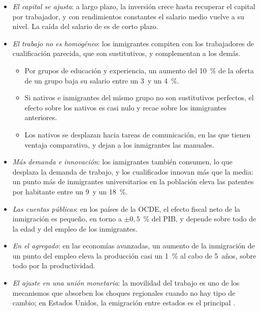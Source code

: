 \documentclass[11pt]{article}
\begin{document}
\begin{itemize}
\item \emph{El capital se ajusta}: a largo plazo, la inversión crece hasta recuperar el capital por trabajador, y con rendimientos constantes el salario medio vuelve a su nivel. La caída del salario de  es de corto plazo\nocite{Borjas2020Labor}.
\item \emph{El trabajo no es homogéneo}: los inmigrantes compiten con los trabajadores de cualificación parecida, que son sustitutivos, y complementan a los demás.
  \begin{itemize}
  \item Por grupos de educación y experiencia, un aumento del 10~\% de la oferta de un grupo baja su salario entre un 3~y un 4~\%\nocite{Borjas2003Labor}.
  \item Si nativos e inmigrantes del mismo grupo no son sustitutivos perfectos, el efecto sobre los nativos es casi nulo y recae sobre los inmigrantes anteriores\nocite{OttavianoPeri2012}.
  \item Los nativos se desplazan hacia tareas de comunicación, en las que tienen ventaja comparativa, y dejan a los inmigrantes las manuales\nocite{PeriSparber2009}.
  \end{itemize}
\item \emph{Más demanda e innovación}: los inmigrantes también consumen, lo que desplaza la demanda de trabajo, y los cualificados innovan más que la media: un punto más de inmigrantes universitarios en la población eleva las patentes por habitante entre un 9~y un 18~\%\nocite{HuntGauthierLoiselle2010}.
\item \emph{Las cuentas públicas}: en los países de la OCDE, el efecto fiscal neto de la inmigración es pequeño, en torno a $\pm0{,}5$~\% del PIB, y depende sobre todo de la edad y del empleo de los inmigrantes\nocite{OCDE2013IMO}.
\item \emph{En el agregado}: en las economías avanzadas, un aumento de la inmigración de un punto del empleo eleva la producción casi un 1~\% al cabo de 5~años, sobre todo por la productividad\nocite{FMI2020WEOMigracion}.
\item \emph{El ajuste en una unión monetaria}: la movilidad del trabajo es uno de los mecanismos que absorben los choques regionales cuando no hay tipo de cambio; en Estados Unidos, la emigración entre estados es el principal\nocite{BlanchardKatz1992Regional} .
\end{itemize}
\end{document}
